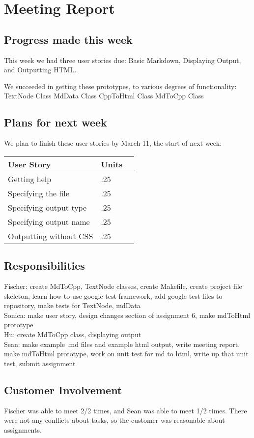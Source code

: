 \section{Meeting Report}

\subsection{Progress made this week}
This week we had three user stories due: Basic Markdown, Displaying Output, and Outputting HTML. 

We succeeded in getting these prototypes, to various degrees of functionality: 
TextNode Class
MdData Class
CppToHtml Class
MdToCpp Class



\subsection{Plans for next week}
We plan to finish these user stories by March 11, the start of next week:

 \begin{center}
    \begin{tabular}{ | l | l | p{5cm} |}
    \hline
    User Story & Units \\ \hline
    Getting help & .25 \\ \hline
    Specifying the file & .25 \\ \hline
    Specifying output type & .25 \\ \hline
    Specifying output name & .25 \\ \hline
    Outputting without CSS & .25 \\ \hline
    \end{tabular}
\end{center}


\subsection{Responsibilities}
Fischer: create MdToCpp, TextNode classes, create Makefile, create project file skeleton, learn how to use google test framework, add google test files to repository, make tests for TextNode, mdData \\
Sonica: make user story, design changes section of assignment 6, make mdToHtml prototype\\
Hu: create MdToCpp class, displaying output\\
Sean: make example .md files and example html output, write meeting report, make mdToHtml prototype, work on unit test for md to html, write up that unit test, submit assignment\\

\subsection{Customer Involvement}
Fischer was able to meet 2/2 times, and Sean was able to meet 1/2 times.
There were not any conflicts about tasks, so the customer was reasonable about assignments.

